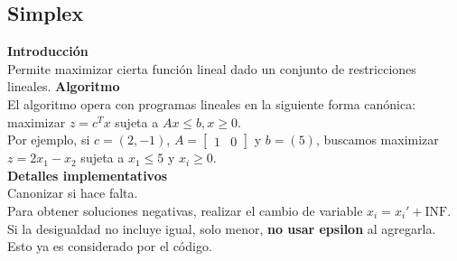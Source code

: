 {\begin{itemize}
\end{itemize}


\subsection{Simplex}
\textbf{Introducción} \\
Permite maximizar cierta función lineal dado un conjunto de restricciones lineales.
\textbf{Algoritmo} \\
El algoritmo opera con programas lineales en la siguiente forma canónica: maximizar \(z = c^{T}x \) sujeta a \(Ax \leq b, x \geq 0\).  \\
Por ejemplo, si \(c=(2, -1)\), \(A=\begin{bmatrix} 1 & 0 \end{bmatrix}\) y \(b=(5)\), 
buscamos maximizar \(z = 2x_1 - x_2\) sujeta a \(x_1 \leq 5\) y \(x_i \geq 0\). \\
\textbf{Detalles implementativos} \\
Canonizar si hace falta.\\
Para obtener soluciones negativas, realizar el cambio de variable \(x_i = x_i' + \text{INF}\).\\
Si la desigualdad no incluye igual, solo menor, \textbf{no usar epsilon} al agregarla. Esto ya es considerado por el código.

}
